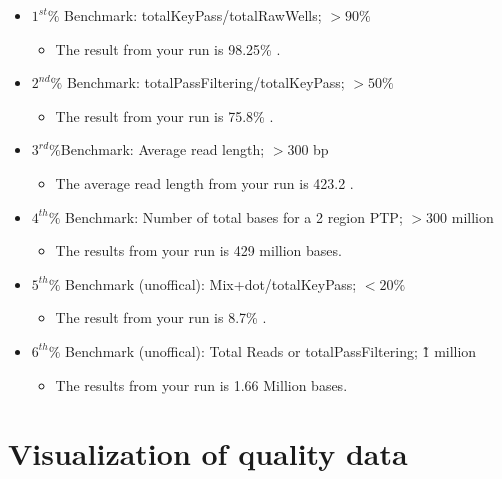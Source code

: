 \documentclass[11pt]{article}
\begin{document}
\begin{itemize}
    \item $1^{st}\%$ Benchmark: totalKeyPass/totalRawWells; $>90\%$
        \begin{itemize}
            \item The result from your run is 98.25\% .
        \end{itemize}
    \item $2^{nd}\%$ Benchmark: totalPassFiltering/totalKeyPass; $>50\%$
     	\begin{itemize}
	    \item The result from your run is 75.8\% .
    	\end{itemize}
    \item $3^{rd}\%$Benchmark: Average read length; $>300$ bp
	\begin{itemize}
	    \item The average read length from your run is 423.2 .
        \end{itemize}
    \item $4^{th}\%$ Benchmark: Number of total bases for a 2 region PTP; $>300$ million
	\begin{itemize}
	    \item The results from your run is 429 million bases.
	\end{itemize}
    \item $5^{th}\%$ Benchmark (unoffical): Mix+dot/totalKeyPass; $<20\%$
        \begin{itemize}
            \item The result from your run is 8.7\% .
        \end{itemize}
    \item $6^{th}\%$ Benchmark (unoffical): Total Reads or totalPassFiltering; \~1 million
        \begin{itemize}
            \item The results from your run is 1.66 Million bases.
        \end{itemize}
\end{itemize}


\section{Visualization of quality data}
\end{document}
